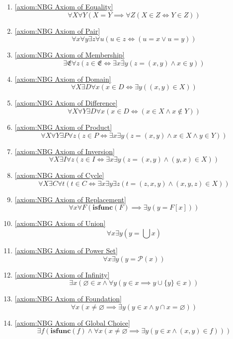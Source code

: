 \begin{enumerate}
    \item \ref{axiom:NBG Axiom of Equality}
    \[
        \forall X \forall Y (X = Y \implies \forall Z (X \in Z \iff Y \in Z))
    \]
    \item \ref{axiom:NBG Axiom of Pair}
    \[
        \forall x \forall y \exists z \forall u (u \in z \iff (u = x \lor u = y))
    \]
    \item \ref{axiom:NBG Axiom of Membership}
    \[
        \exists \mathfrak{E} \forall z (z \in \mathfrak{E} \iff \exists x \exists y (z = (x,y) \land x \in y))
    \]
    \item \ref{axiom:NBG Axiom of Domain}
    \[
        \forall X \exists D \forall x (x \in D \iff \exists y ((x,y) \in X))
    \]
    \item \ref{axiom:NBG Axiom of Difference}
    \[
        \forall X \forall Y \exists D \forall x (x \in D \iff (x \in X \land x \notin Y))
    \]
    \item \ref{axiom:NBG Axiom of Product}
    \[
        \forall X \forall Y \exists P \forall z (z \in P \iff \exists x \exists y (z = (x,y) \land x \in X \land y \in Y))
    \]
    \item \ref{axiom:NBG Axiom of Inversion}
    \[
        \forall X \exists I \forall z (z \in I \iff \exists x \exists y (z = (x,y) \land (y,x) \in X))
    \]
    \item \ref{axiom:NBG Axiom of Cycle}
    \[
        \forall X \exists C \forall t (t \in C \iff \exists x \exists y \exists z (t = (z,x,y) \land (x,y,z) \in X))
    \]
    \item \ref{axiom:NBG Axiom of Replacement}
    \[
        \forall x \forall F (\mathbf{isfunc} (F) \implies \exists y (y = F[x]))
    \]
    \item \ref{axiom:NBG Axiom of Union}
    \[
        \forall x \exists y (y = \bigcup x)
    \]
    \item \ref{axiom:NBG Axiom of Power Set}
    \[
        \forall x \exists y (y = \mathcal{P} (x))
    \]
    \item \ref{axiom:NBG Axiom of Infinity}
    \[
        \exists x (\varnothing \in x \land \forall y (y \in x \implies y \cup \{y\} \in x))
    \]
    \item \ref{axiom:NBG Axiom of Foundation}
    \[
        \forall x (x \neq \varnothing \implies \exists y (y \in x \land y \cap x = \varnothing))
    \]
    \item \ref{axiom:NBG Axiom of Global Choice}
    \[
        \exists f (\mathbf{isfunc} (f) \land \forall x (x \neq \varnothing \implies \exists y (y \in x \land (x,y) \in f)))
    \]
\end{enumerate}

